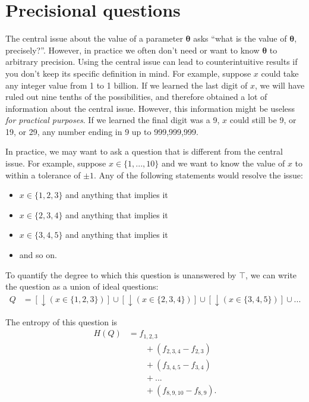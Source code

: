 \documentclass[entropy,article,accept,oneauthor,pdftex,10pt,a4paper]{mdpi}
\newcommand{\x}{\boldsymbol{\theta}}
\begin{document}
\appendix
\section{Precisional questions}

The central issue about the value of a parameter $\x$ asks
``what is the value of $\x$, precisely?''. However, in practice we often
don't need or want to know $\x$ to arbitrary precision. Using the central
issue can lead to counterintuitive results if you don't keep its specific
definition in mind. For example, suppose $x$ could take any integer value
from 1 to 1 billion. If we learned the last digit of $x$, we
will have ruled out nine tenths of the possibilities, and therefore obtained
a lot of information about the central issue. However,
this information might be useless {\em for practical purposes}.
If we learned the final
digit was a 9, $x$ could still be 9, or 19, or 29, any number ending in 9
up to 999,999,999.

In practice, we may
want to ask a question that is different from the central issue.
For example, suppose $x \in \{1, ..., 10\}$ and
we want to know the value of $x$ to within a tolerance
of $\pm 1$. Any of the following statements would resolve the issue:
\begin{itemize}
\item $x \in \{1, 2, 3\}$ and anything that implies it
\item $x \in \{2, 3, 4\}$ and anything that implies it
\item $x \in \{3, 4, 5\}$ and anything that implies it
\item and so on.
\end{itemize}
To quantify the degree to which this question is unanswered by
$\top$, we can write the question as a union of ideal questions:
\begin{align}
Q &= \left[\downarrow (x \in \{1, 2, 3\})\right] \cup
     \left[\downarrow (x \in \{2, 3, 4\})\right] \cup
     \left[\downarrow (x \in \{3, 4, 5\})\right] \cup ...
\end{align}

The entropy of this question is
\begin{align}
H(Q) &= f_{1,2,3}\\
     & \quad \quad + \left(f_{2,3,4} - f_{2,3}\right) \\
     & \quad \quad + \left(f_{3,4,5} - f_{3,4}\right) \\
     & \quad \quad + ... \\
     & \quad \quad + \left(f_{8,9,10} - f_{8,9}\right).
\end{align}
\end{document}
